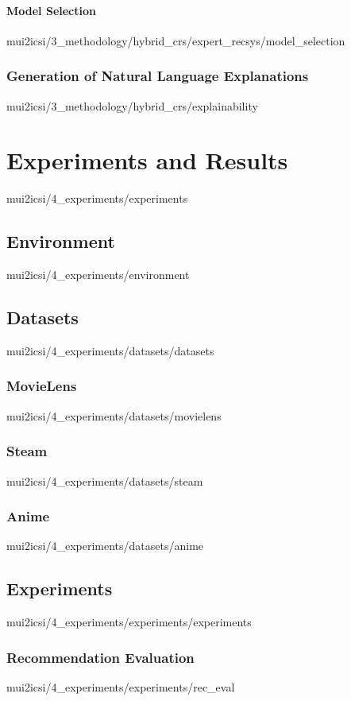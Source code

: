 \documentclass[english,epsbased,copyright,final,printable,covers,extendedindex,firstnumbered,tfm,gnuplot,loc,loe,lof,lot]{tfgtfmthesisuam}
\begin{document}
        \subsubsection{Model Selection\label{SSS:MODELSELECT}}{mui2icsi/3_methodology/hybrid_crs/expert_recsys/model_selection}
      \subsection{Generation of Natural Language Explanations\label{SS:GENEXPLAIN}}{mui2icsi/3_methodology/hybrid_crs/explainability}

  \chapter{Experiments and Results\label{CAP:EXPRES}}{mui2icsi/4_experiments/experiments}
    \section{Environment\label{SEC:ENVIRONMENT}}{mui2icsi/4_experiments/environment}

    \section{Datasets\label{SEC:DATASETS}}{mui2icsi/4_experiments/datasets/datasets}
      \subsection{MovieLens\label{SS:MOVIELENS}}{mui2icsi/4_experiments/datasets/movielens}
      \subsection{Steam\label{SS:STEAM}}{mui2icsi/4_experiments/datasets/steam}
      \subsection{Anime\label{SS:LASTFM}}{mui2icsi/4_experiments/datasets/anime}

    \section{Experiments\label{SEC:EXPERIMENTS}}{mui2icsi/4_experiments/experiments/experiments}
      \subsection{Recommendation Evaluation\label{SS:RECEVAL}}{mui2icsi/4_experiments/experiments/rec_eval}
\end{document}
